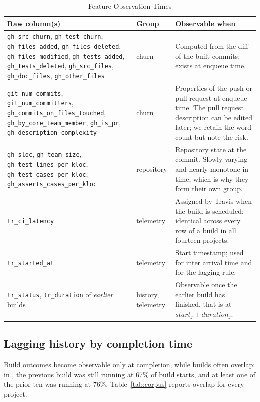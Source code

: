 \documentclass[sigconf,review,anonymous,nonacm]{acmart}
\newcommand{\proj}[1]{\path{#1}}
\newcommand{\col}[1]{\texttt{#1}}
\begin{document}
\begin{table}[htbp]
\centering
\small
\caption{Feature Observation Times}
\label{tab:observation}
\scriptsize\setlength{\tabcolsep}{2pt}
\begin{tabular}{p{2.7cm}p{1.1cm}p{3.95cm}}
\toprule
Raw column(s) & Group & Observable when \\
\midrule
\col{gh\_src\_churn}, \col{gh\_test\_churn}, \col{gh\_files\_added}, \col{gh\_files\_deleted}, \col{gh\_files\_modified}, \col{gh\_tests\_added}, \col{gh\_tests\_deleted}, \col{gh\_src\_files}, \col{gh\_doc\_files}, \col{gh\_other\_files} & churn & Computed from the diff of the built commits; exists at enqueue time. \\
\col{git\_num\_commits}, \col{git\_num\_committers}, \texttt{gh\_commits\allowbreak\_on\allowbreak\_files\allowbreak\_touched}, \col{gh\_by\_core\_team\_member}, \col{gh\_is\_pr}, \col{gh\_description\_complexity} & churn & Properties of the push or pull request at enqueue time. The pull request description can be edited later; we retain the word count but note the risk. \\
\col{gh\_sloc}, \col{gh\_team\_size}, \col{gh\_test\_lines\_per\_kloc}, \col{gh\_test\_cases\_per\_kloc}, \col{gh\_asserts\_cases\_per\_kloc} & repository & Repository state at the commit. Slowly varying and nearly monotone in time, which is why they form their own group. \\
\col{tr\_ci\_latency} & telemetry & Assigned by Travis when the build is scheduled; identical across every row of a build in all fourteen projects. \\
\col{tr\_started\_at} & telemetry & Start timestamp; used for inter arrival time and for the lagging rule. \\
\col{tr\_status}, \col{tr\_duration} of \emph{earlier} builds & history, telemetry & Observable once the earlier build has finished, that is at $\mathit{start}_j + \mathit{duration}_j$. \\
\bottomrule
\end{tabular}
\end{table}

\subsection{Lagging history by completion time}
\label{sec:design-lagging}

Build outcomes become observable only at completion, while builds often overlap: in \proj{rails/rails}, the previous build was still running at 67\% of build starts, and at least one of the prior ten was running at 76\%. Table~\ref{tab:corpus} reports overlap for every project.
\end{document}
